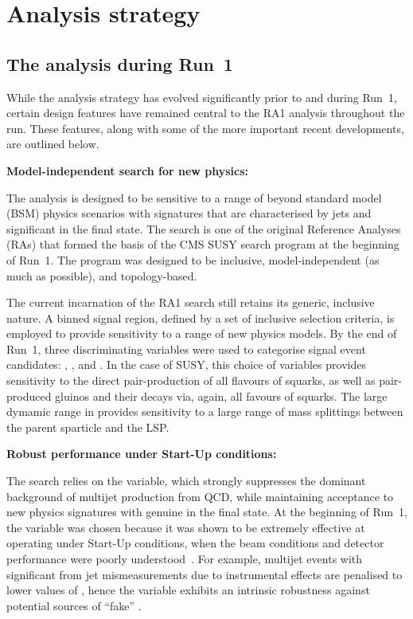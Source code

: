 \section{Analysis strategy}
\label{sec:strategy}

\subsection{The analysis during Run~1}

While the analysis strategy has evolved significantly prior to and
during Run~1, certain design features have remained central to the RA1
analysis throughout the run. These features, along with some of the
more important recent developments, are outlined below.

{\bf Model-independent search for new physics:}

The analysis is designed to be sensitive to a range of beyond standard
model (BSM) physics scenarios with signatures that are characterised
by jets and significant \met in the final state. The search is one of
the original Reference Analyses (RAs) that formed the basis of the CMS
SUSY search program at the beginning of Run~1. The program was
designed to be inclusive, model-independent (as much as possible), and
topology-based. 

The current incarnation of the RA1 search still retains its generic,
inclusive nature. A binned signal region, defined by a set of
inclusive selection criteria, is employed to provide sensitivity to a
range of new physics models. By the end of Run~1, three discriminating
variables were used to categorise signal event candidates: \scalht,
\njet, and \nb. In the case of SUSY, this choice of variables provides
sensitivity to the direct pair-production of all flavours of squarks,
as well as pair-produced gluinos and their decays via, again, all
favours of squarks. The large dymamic range in \scalht provides
sensitivity to a large range of mass splittings between the parent
sparticle and the LSP.

{\bf Robust performance under Start-Up conditions:}

The search relies on the \alphat variable, which strongly suppresses
the dominant background of multijet production from QCD, while
maintaining acceptance to new physics signatures with genuine \met in
the final state. At the beginning of Run~1, the \alphat variable was
chosen because it was shown to be extremely effective at operating
under Start-Up conditions, when the beam conditions and detector
performance were poorly understood~\cite{REF}. For example, multijet
events with significant \met from jet mismeasurements due to
instrumental effects are penalised to lower values of \alphat, hence
the variable exhibits an intrinsic robustness against potential
sources of ``fake'' \met.

